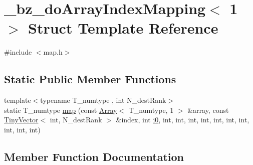 \hypertarget{struct__bz__doArrayIndexMapping_3_011_01_4}{}\section{\+\_\+bz\+\_\+do\+Array\+Index\+Mapping$<$ 1 $>$ Struct Template Reference}
\label{struct__bz__doArrayIndexMapping_3_011_01_4}


{\ttfamily \#include $<$map.\+h$>$}

\subsection*{Static Public Member Functions}
\begin{DoxyCompactItemize}
\item 
{\footnotesize template$<$typename T\+\_\+numtype , int N\+\_\+dest\+Rank$>$ }\\static T\+\_\+numtype \hyperlink{struct__bz__doArrayIndexMapping_3_011_01_4_a306172182adb328da0d9ddc87751bd91}{map} (const \hyperlink{classArray}{Array}$<$ T\+\_\+numtype, 1 $>$ \&array, const \hyperlink{classTinyVector}{Tiny\+Vector}$<$ int, N\+\_\+dest\+Rank $>$ \&index, int \hyperlink{cephes_8h_aacd2643d920288e61be16787561a4514}{i0}, int, int, int, int, int, int, int, int, int, int)
\end{DoxyCompactItemize}


\subsection{Member Function Documentation}
\hypertarget{struct__bz__doArrayIndexMapping_3_011_01_4_a306172182adb328da0d9ddc87751bd91}{}
